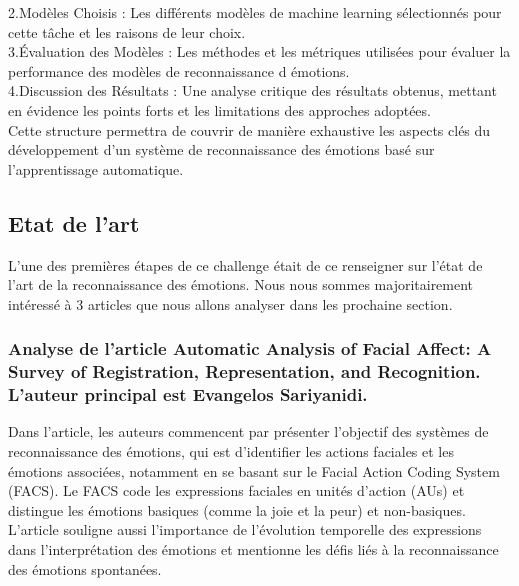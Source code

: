 \documentclass{rapport}
\begin{document}
2.Modèles Choisis :
Les différents modèles de machine learning sélectionnés pour cette tâche et les raisons de leur choix.\\

3.Évaluation des Modèles :
Les méthodes et les métriques utilisées pour évaluer la performance des modèles de reconnaissance d émotions.\\

4.Discussion des Résultats :
Une analyse critique des résultats obtenus,
mettant en évidence les points forts et les limitations des approches adoptées.\\

Cette structure permettra de couvrir de manière exhaustive les aspects clés du développement
d'un système de reconnaissance des émotions basé sur l'apprentissage automatique.

\subsection{Etat de l'art}

L'une des premières étapes de ce challenge était de ce renseigner sur l'état
de l'art de la reconnaissance des émotions. Nous nous sommes majoritairement
intéressé à 3 articles que nous allons analyser dans les prochaine section.

\subsubsection{Analyse de l'article \cite{sariyanidiAutomaticAnalysisFacial2015} Automatic Analysis of Facial Affect: A Survey of Registration, Representation, and Recognition. L'auteur principal est Evangelos Sariyanidi.}

Dans l'article, les auteurs commencent par présenter l'objectif des systèmes de
reconnaissance des émotions, qui est d'identifier les actions faciales et les
émotions associées, notamment en se basant sur le Facial Action Coding System (FACS).
Le FACS code les expressions faciales en unités d'action (AUs) et distingue
les émotions basiques (comme la joie et la peur) et non-basiques. L'article
souligne aussi l'importance de l'évolution temporelle des expressions dans
l'interprétation des émotions et mentionne les défis liés à la reconnaissance des
émotions spontanées.
\end{document}
